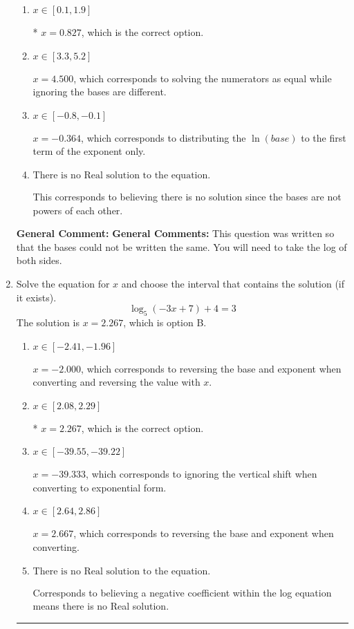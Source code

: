 \documentclass{extbook}[14pt]
\newcommand{\litem}[1]{\item #1

\rule{\textwidth}{0.4pt}}
\begin{document}
\begin{enumerate}
{\begin{enumerate}[label=\Alph*.]
$x = -10.219$, which corresponds to distributing the $\ln(base)$ to the second term of the exponent only.
\item \( x \in [0.1, 1.9] \)

* $x = 0.827$, which is the correct option.
\item \( x \in [3.3, 5.2] \)

$x = 4.500$, which corresponds to solving the numerators as equal while ignoring the bases are different.
\item \( x \in [-0.8, -0.1] \)

$x = -0.364$, which corresponds to distributing the $\ln(base)$ to the first term of the exponent only.
\item \( \text{There is no Real solution to the equation.} \)

This corresponds to believing there is no solution since the bases are not powers of each other.
\end{enumerate}

\textbf{General Comment:} \textbf{General Comments:} This question was written so that the bases could not be written the same. You will need to take the log of both sides.
}
\litem{
Solve the equation for $x$ and choose the interval that contains the solution (if it exists).
\[ \log_{5}{(-3x+7)}+4 = 3 \]The solution is \( x = 2.267 \), which is option B.\begin{enumerate}[label=\Alph*.]
\item \( x \in [-2.41, -1.96] \)

$x = -2.000$, which corresponds to reversing the base and exponent when converting and reversing the value with $x$.
\item \( x \in [2.08, 2.29] \)

* $x = 2.267$, which is the correct option.
\item \( x \in [-39.55, -39.22] \)

$x = -39.333$, which corresponds to ignoring the vertical shift when converting to exponential form.
\item \( x \in [2.64, 2.86] \)

$x = 2.667$, which corresponds to reversing the base and exponent when converting.
\item \( \text{There is no Real solution to the equation.} \)

Corresponds to believing a negative coefficient within the log equation means there is no Real solution.
\end{enumerate}

}
\end{enumerate}
\end{document}
